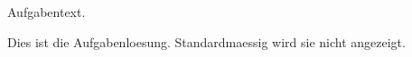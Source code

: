 \begin{atiTask}[
  title = Aufgabentitel,
  type = Aufgabentyp,
  points = 5
]
  Aufgabentext.
\end{atiTask}
\begin{atiSolution}
  Dies ist die Aufgabenloesung.
  Standardmaessig wird sie nicht angezeigt.
\end{atiSolution}